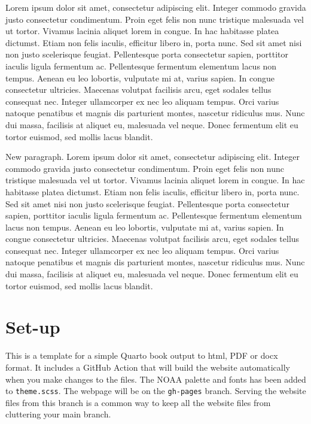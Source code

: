 \documentclass[
  letterpaper,
  oneside,
  open=any]{scrbook}
\begin{document}
Lorem ipsum dolor sit amet, consectetur adipiscing elit. Integer commodo
gravida justo consectetur condimentum. Proin eget felis non nunc
tristique malesuada vel ut tortor. Vivamus lacinia aliquet lorem in
congue. In hac habitasse platea dictumst. Etiam non felis iaculis,
efficitur libero in, porta nunc. Sed sit amet nisi non justo scelerisque
feugiat. Pellentesque porta consectetur sapien, porttitor iaculis ligula
fermentum ac. Pellentesque fermentum elementum lacus non tempus. Aenean
eu leo lobortis, vulputate mi at, varius sapien. In congue consectetur
ultricies. Maecenas volutpat facilisis arcu, eget sodales tellus
consequat nec. Integer ullamcorper ex nec leo aliquam tempus. Orci
varius natoque penatibus et magnis dis parturient montes, nascetur
ridiculus mus. Nunc dui massa, facilisis at aliquet eu, malesuada vel
neque. Donec fermentum elit eu tortor euismod, sed mollis lacus blandit.

New paragraph. Lorem ipsum dolor sit amet, consectetur adipiscing elit.
Integer commodo gravida justo consectetur condimentum. Proin eget felis
non nunc tristique malesuada vel ut tortor. Vivamus lacinia aliquet
lorem in congue. In hac habitasse platea dictumst. Etiam non felis
iaculis, efficitur libero in, porta nunc. Sed sit amet nisi non justo
scelerisque feugiat. Pellentesque porta consectetur sapien, porttitor
iaculis ligula fermentum ac. Pellentesque fermentum elementum lacus non
tempus. Aenean eu leo lobortis, vulputate mi at, varius sapien. In
congue consectetur ultricies. Maecenas volutpat facilisis arcu, eget
sodales tellus consequat nec. Integer ullamcorper ex nec leo aliquam
tempus. Orci varius natoque penatibus et magnis dis parturient montes,
nascetur ridiculus mus. Nunc dui massa, facilisis at aliquet eu,
malesuada vel neque. Donec fermentum elit eu tortor euismod, sed mollis
lacus blandit.


\chapter{Set-up}\label{set-up}

This is a template for a simple Quarto book output to html, PDF or docx
format. It includes a GitHub Action that will build the website
automatically when you make changes to the files. The NOAA palette and
fonts has been added to \texttt{theme.scss}. The webpage will be on the
\texttt{gh-pages} branch. Serving the website files from this branch is
a common way to keep all the website files from cluttering your main
branch.
\end{document}
